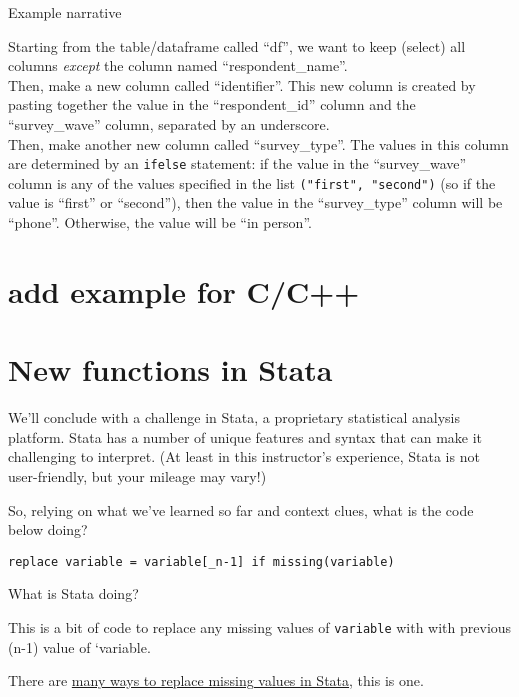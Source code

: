 \documentclass[
]{book}
\begin{document}
Example narrative

Starting from the table/dataframe called ``df'', we want to keep (select) all columns \emph{except} the column named ``respondent\_name''.\\

Then, make a new column called ``identifier''. This new column is created by pasting together the value in the ``respondent\_id'' column and the ``survey\_wave'' column, separated by an underscore.\\

Then, make another new column called ``survey\_type''. The values in this column are determined by an \texttt{ifelse} statement: if the value in the ``survey\_wave'' column is any of the values specified in the list \texttt{("first",\ "second")} (so if the value is ``first'' or ``second''), then the value in the ``survey\_type'' column will be ``phone''. Otherwise, the value will be ``in person''.\\

\hfill\break

\section{add example for C/C++}\label{add-example-for-cc}

\section{New functions in Stata}\label{new-functions-in-stata}

We'll conclude with a challenge in Stata, a proprietary statistical analysis platform. Stata has a number of unique features and syntax that can make it challenging to interpret. (At least in this instructor's experience, Stata is not user-friendly, but your mileage may vary!)

So, relying on what we've learned so far and context clues, what is the code below doing?

\begin{verbatim}
replace variable = variable[_n-1] if missing(variable)
\end{verbatim}

What is Stata doing?

This is a bit of code to replace any missing values of \texttt{variable} with with previous (n-1) value of `variable.

There are \href{https://www.stata.com/support/faqs/data-management/replacing-missing-values/}{many ways to replace missing values in Stata}, this is one.
\end{document}
